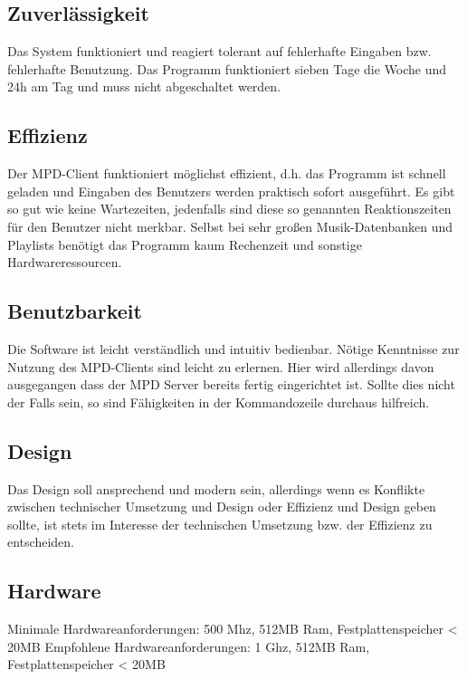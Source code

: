 \subsection{Zuverlässigkeit}
Das System funktioniert und reagiert tolerant auf fehlerhafte Eingaben bzw. fehlerhafte Benutzung.
Das Programm funktioniert sieben Tage die Woche und 24h am Tag und muss nicht abgeschaltet werden.

\subsection{Effizienz}
Der MPD-Client funktioniert möglichst effizient, d.h. das Programm ist schnell geladen und Eingaben des Benutzers
werden praktisch sofort ausgeführt. Es gibt so gut wie keine Wartezeiten, jedenfalls sind diese 
so genannten Reaktionszeiten für den Benutzer nicht merkbar. Selbst bei sehr großen Musik-Datenbanken
und Playlists benötigt das Programm kaum Rechenzeit und sonstige Hardwareressourcen.

\subsection{Benutzbarkeit}
Die Software ist leicht verständlich und intuitiv bedienbar. Nötige Kenntnisse zur Nutzung des 
MPD-Clients sind leicht zu erlernen. Hier wird allerdings davon ausgegangen dass der MPD Server bereits
fertig eingerichtet ist. Sollte dies nicht der Falls sein, so sind Fähigkeiten in der Kommandozeile 
durchaus hilfreich.

\subsection{Design}
Das Design soll ansprechend und modern sein, allerdings wenn es Konflikte zwischen technischer Umsetzung 
und Design oder Effizienz und Design geben sollte, ist stets im Interesse der technischen Umsetzung bzw. 
der Effizienz zu entscheiden.
\subsection{Hardware}
Minimale Hardwareanforderungen: 500 Mhz, 512MB Ram, Festplattenspeicher < 20MB
Empfohlene Hardwareanforderungen: 1 Ghz, 512MB Ram, Festplattenspeicher < 20MB

